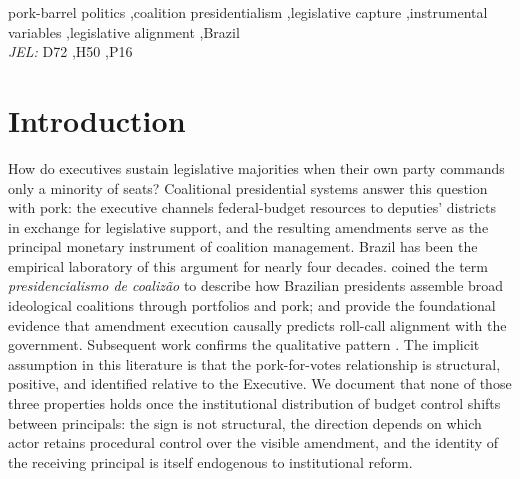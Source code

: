 \documentclass[preprint,12pt,authoryear]{elsarticle}
\begin{document}
\begin{frontmatter}
\begin{keyword}
pork-barrel politics \sep coalition presidentialism \sep legislative capture \sep instrumental variables \sep legislative alignment \sep Brazil
\\[2pt]
\textit{JEL:} D72 \sep H50 \sep P16
\end{keyword}

\end{frontmatter}

\section{Introduction}
\label{sec:intro}

How do executives sustain legislative majorities when their own party commands only a minority of seats? Coalitional presidential systems answer this question with pork: the executive channels federal-budget resources to deputies' districts in exchange for legislative support, and the resulting amendments serve as the principal monetary instrument of coalition management. Brazil has been the empirical laboratory of this argument for nearly four decades. \citet{Abranches1988} coined the term \emph{presidencialismo de coaliz\~ao} to describe how Brazilian presidents assemble broad ideological coalitions through portfolios and pork; \citet{PereiraAndMueller2004} and \citet{Raile2011} provide the foundational evidence that amendment execution causally predicts roll-call alignment with the government. Subsequent work confirms the qualitative pattern \citep{Zucco2009,Power2010,FigueiredoLimongi2000}. The implicit assumption in this literature is that the pork-for-votes relationship is structural, positive, and identified relative to the Executive. We document that none of those three properties holds once the institutional distribution of budget control shifts between principals: the sign is not structural, the direction depends on which actor retains procedural control over the visible amendment, and the identity of the receiving principal is itself endogenous to institutional reform.
\end{document}
